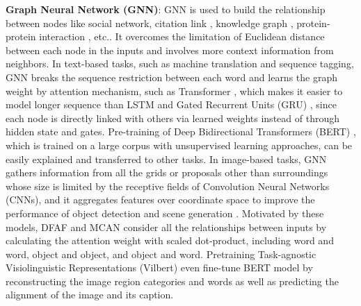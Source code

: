 \documentclass[10pt,twocolumn,letterpaper]{article}
\begin{document}
\textbf{Graph Neural Network (GNN)}: GNN is used to build the relationship between nodes like social network, citation link \cite{hamilton2017inductive}, knowledge graph \cite{kipf2016semi}, protein-protein interaction \cite{velickovic2017graph}, etc.. It overcomes the limitation of Euclidean distance between each node in the inputs and involves more context information from neighbors. In text-based tasks, such as machine translation and sequence tagging, GNN breaks the sequence restriction between each word and learns the graph weight by attention mechanism, such as Transformer \cite{vaswani2017attention}, which makes it easier to model longer sequence than LSTM and Gated Recurrent Units (GRU) \cite{chung2014empirical}, since each node is directly linked with others via learned weights instead of through hidden state and gates. Pre-training of Deep Bidirectional Transformers (BERT) \cite{devlin2018bert}, which is trained on a large corpus with unsupervised learning approaches, can be easily explained and transferred to other tasks. In image-based tasks, GNN gathers information from all the grids \cite{wang2018non, chen2019graph} or proposals \cite{liu2018structure} other than surroundings whose size is limited by the receptive fields of Convolution Neural Networks (CNNs), and it aggregates features over coordinate space to improve the performance of object detection and scene generation \cite{yang2018graph}. Motivated by these models, DFAF \cite{gao2019dynamic} and MCAN \cite{yu2019deep} consider all the relationships between inputs by calculating the attention weight with scaled dot-product, including word and word, object and object, and object and word. Pretraining Task-agnostic Visiolinguistic Representations (Vilbert) \cite{lu2019vilbert} even fine-tune BERT model by reconstructing the image region categories and words as well as predicting the alignment of the image and its caption. 
\end{document}

